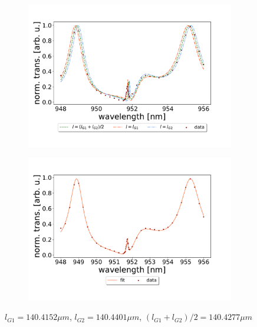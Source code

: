 \begin{figure}[h!]
    \centering
    \begin{subfigure}[b]{0.49\textwidth}
        \centering
        \includegraphics[width=\textwidth]{figures/results/129um_long_scan_sim_comparison.pdf}
        \caption{}
        \label{fig:129um_long_scan_sim_comparison}
    \end{subfigure}
    \begin{subfigure}[b]{0.49\textwidth}
        \centering
        \includegraphics[width=\textwidth]{figures/results/129um_long_scan_fit.pdf}
        \caption{}
        \label{fig:129um_long_scan_fit}
    \end{subfigure}
    \caption{$l_{G1} = 140.4152 \mu m$, $l_{G2} = 140.4401 \mu m$, $(l_{G1} + l_{G2})/2 = 140.4277 \mu m$}
    \label{fig:129um_cavity_fit_and_sim}
\end{figure}

